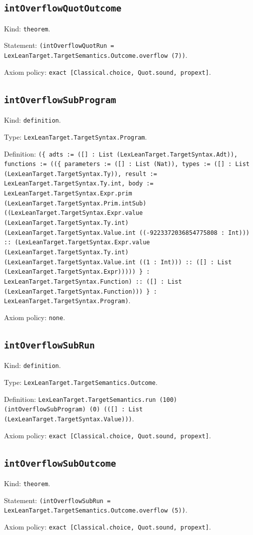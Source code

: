 \documentclass[11pt]{article}
\begin{document}
\subsection*{\texttt{intOverflowQuotOutcome}}
\noindent Kind: \texttt{theorem}.\par
\noindent Statement: \texttt{(intOverflowQuotRun = LexLeanTarget.TargetSemantics.Outcome.overflow (7))}.\par
\noindent Axiom policy: \texttt{exact [Classical.choice, Quot.sound, propext]}.\par
\subsection*{\texttt{intOverflowSubProgram}}
\noindent Kind: \texttt{definition}.\par
\noindent Type: \texttt{LexLeanTarget.TargetSyntax.Program}.\par
\noindent Definition: \texttt{(\{ adts := ([] : List (LexLeanTarget.TargetSyntax.Adt)), functions := ((\{ parameters := ([] : List (Nat)), types := ([] : List (LexLeanTarget.TargetSyntax.Ty)), result := LexLeanTarget.TargetSyntax.Ty.int, body := LexLeanTarget.TargetSyntax.Expr.prim (LexLeanTarget.TargetSyntax.Prim.intSub) ((LexLeanTarget.TargetSyntax.Expr.value (LexLeanTarget.TargetSyntax.Ty.int) (LexLeanTarget.TargetSyntax.Value.int ((-9223372036854775808 : Int))) :: (LexLeanTarget.TargetSyntax.Expr.value (LexLeanTarget.TargetSyntax.Ty.int) (LexLeanTarget.TargetSyntax.Value.int ((1 : Int))) :: ([] : List (LexLeanTarget.TargetSyntax.Expr))))) \} : LexLeanTarget.TargetSyntax.Function) :: ([] : List (LexLeanTarget.TargetSyntax.Function))) \} : LexLeanTarget.TargetSyntax.Program)}.\par
\noindent Axiom policy: \texttt{none}.\par
\subsection*{\texttt{intOverflowSubRun}}
\noindent Kind: \texttt{definition}.\par
\noindent Type: \texttt{LexLeanTarget.TargetSemantics.Outcome}.\par
\noindent Definition: \texttt{LexLeanTarget.TargetSemantics.run (100) (intOverflowSubProgram) (0) (([] : List (LexLeanTarget.TargetSyntax.Value)))}.\par
\noindent Axiom policy: \texttt{exact [Classical.choice, Quot.sound, propext]}.\par
\subsection*{\texttt{intOverflowSubOutcome}}
\noindent Kind: \texttt{theorem}.\par
\noindent Statement: \texttt{(intOverflowSubRun = LexLeanTarget.TargetSemantics.Outcome.overflow (5))}.\par
\noindent Axiom policy: \texttt{exact [Classical.choice, Quot.sound, propext]}.\par
\end{document}
